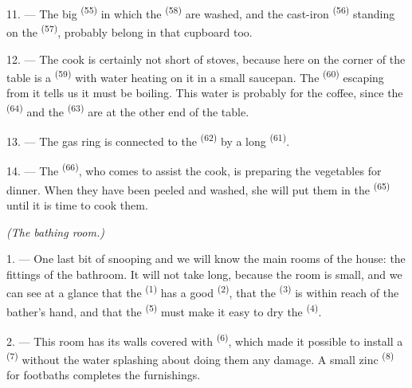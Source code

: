 \VUsaut{4.0mm}
\VUsaut{3.0mm}

11. --- The big  \textsuperscript{(55)} in which the 
\textsuperscript{(58)} are washed, and the cast-iron  \textsuperscript{(56)}
standing on the  \textsuperscript{(57)}, probably belong in that cupboard
too.

12. --- The cook is certainly not short of stoves, because here on the corner of the table is
a  \textsuperscript{(59)} with water heating on it in a small saucepan. The
 \textsuperscript{(60)} escaping from it tells us it must be boiling. This water
is probably for the coffee, since the  \textsuperscript{(64)} and the
 \textsuperscript{(63)} are at the other end of the table.

13. --- The gas ring is connected to the  \textsuperscript{(62)} by a long
 \textsuperscript{(61)}.

14. --- The  \textsuperscript{(66)}, who comes to assist the cook, is
preparing the vegetables for dinner. When they have been peeled and washed, she will put them
in the  \textsuperscript{(65)} until it is time to cook them.

\VUsaut{4.0mm}
{\centering\fontsize{10.2pt}{10.2pt}\selectfont{} \textit{(The bathing room.)}\par}
\VUsaut{3.0mm}

1. --- One last bit of snooping and we will know the main rooms of the house: the fittings of
the bathroom. It will not take long, because the room is small, and we can see at a glance
that the
 \textsuperscript{(1)} has a good 
\textsuperscript{(2)}, that the  \textsuperscript{(3)} is within reach of
the bather's hand, and that the  \textsuperscript{(5)} must make it easy to
dry the  \textsuperscript{(4)}.

2. --- This room has its walls covered with  \textsuperscript{(6)}, which
made it possible to install a  \textsuperscript{(7)} without the water
splashing about doing them any damage. A small zinc  \textsuperscript{(8)} for
footbaths completes the furnishings.
\VUsaut{6.0mm}
\VUfilet{22mm}
